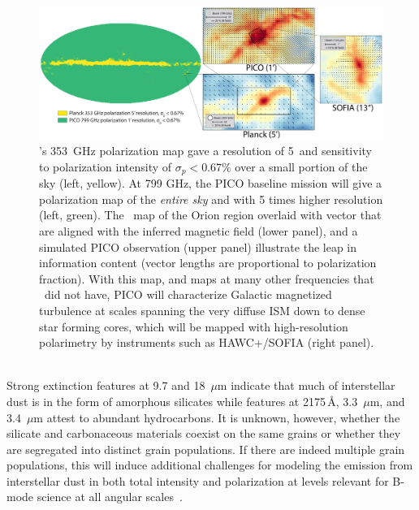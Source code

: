 \documentclass[PICOReport.tex]{subfiles}
\begin{document}
%
%
\begin{figure}
    \centering
    \includegraphics[width=6.5in]{images/galsci_fig_v4.pdf}
    \caption{\captiontext  \planck 's 353~GHz polarization map gave a resolution of 5\arcmin~and sensitivity to polarization intensity of $\sigma_{p} < 0.67\%$ over a small portion of the sky (left, yellow).  At 799 GHz, the PICO baseline mission will give a polarization map of the {\it entire sky} and with 5 times higher resolution (left, green). The \planck~map of the Orion region overlaid with vector that are aligned with the inferred magnetic field (lower panel), and a simulated PICO observation (upper panel) illustrate the leap in information content (vector lengths are proportional to polarization fraction). With this map, and maps at many other frequencies that \planck~did not have, PICO will characterize Galactic magnetized turbulence at scales spanning the very diffuse ISM down to dense star forming cores, which will be mapped with high-resolution polarimetry by instruments such as HAWC+/SOFIA \citep{Chuss2018} (right panel).}
    \label{fig:allsky}
\end{figure}

 \\
Strong extinction features at 9.7 and 18~$\mu$m indicate that much of interstellar dust is in the form of amorphous silicates while features at 2175\,\AA, 3.3~$\mu$m, and 3.4~$\mu$m attest to abundant hydrocarbons. It is unknown, however, whether the silicate and carbonaceous materials coexist on the same grains or whether they are segregated into distinct grain populations. If there are indeed multiple grain populations, this will induce additional challenges for modeling the emission from interstellar dust in both total intensity and polarization at levels relevant for B-mode science at all angular scales~\citep{Hensley2018}. 
\end{document}
